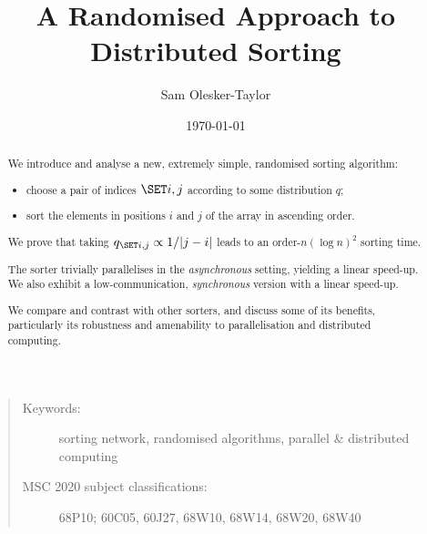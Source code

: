 \documentclass{article}
\title{\sffamily%
	A Randomised Approach to Distributed Sorting
}
\author{\sffamily Sam Olesker-Taylor}
\date{\sffamily \today}
\date{}
\begin{document}
\maketitle

\vspace{-4ex}

\renewcommand{\abstractname}{\sffamily Abstract}

\begin{abstract}
\noindent
We introduce and analyse a new, extremely simple, randomised sorting algorithm:
\begin{itemize}[noitemsep]
	\item 
	choose a pair of indices $\set{i, j}$ according to some distribution $q$;
	
	\item 
	sort the elements in positions $i$ and $j$ of the array in ascending order.
\end{itemize}
We prove that taking $q_{\set{i,j}} \propto 1/\abs{j - i}$ leads to an order-$n (\log n)^2$ sorting time.

The sorter trivially parallelises in the \emph{asynchronous} setting, yielding a linear speed-up. We also exhibit a low-communication, \emph{synchronous} version with a linear speed-up.

We compare and contrast with other sorters, and discuss some of its benefits,
particularly its robustness and amenability to parallelisation and distributed computing.
\end{abstract}

\small
\begin{quote}
\begin{description}
	\item [Keywords:]
	sorting network,
	randomised algorithms,
	parallel \& distributed computing
	
	\item [MSC 2020 subject classifications:]
	68P10;
	60C05, 60J27,
	68W10, 68W14, 68W20, 68W40
\end{description}
\end{quote}
\normalsize


\end{document}
